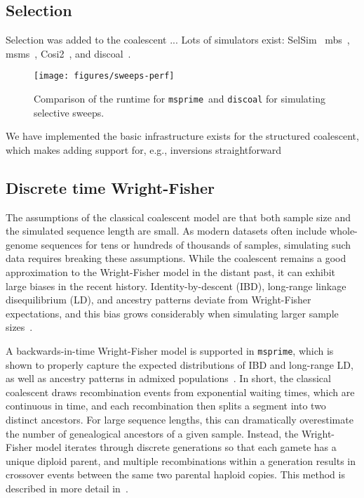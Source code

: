 \documentclass{article}
\newcommand{\msprime}[0]{\texttt{msprime}}
\begin{document}
\subsection*{Selection}
Selection was added to the coalescent ... Lots of simulators exist:
SelSim~\citep{spencer2004selsim}
mbs~\citep{teshima2009mbs},
msms~\citep{ewing2010msms},
Cosi2~\citep{shlyakhter2014cosi2},
and discoal~\citep{kern2016discoal}.

\begin{figure}
\texttt{[image: figures/sweeps-perf]}
\caption{\label{fig-selection-perf}Comparison of the runtime for
\msprime\ and \texttt{discoal} for simulating selective sweeps.
}
\end{figure}

We have implemented the basic infrastructure exists for the structured
coalescent, which makes adding support for, e.g.,
inversions straightforward~\citep{peischl2013sequential}

\subsection*{Discrete time Wright-Fisher}

The assumptions of the classical coalescent model are that both sample size and
the simulated sequence length are small. As modern datasets often include
whole-genome sequences for tens or hundreds of thousands of samples, simulating
such data requires breaking these assumptions. While the coalescent remains a
good approximation to the Wright-Fisher model in the distant past, it can
exhibit large biases in the recent history. Identity-by-descent (IBD),
long-range linkage disequilibrium (LD), and ancestry patterns deviate from
Wright-Fisher expectations, and this bias grows considerably when simulating
larger sample
sizes~\citep{wakeley2012gene,bhaskar2014distortion,nelson2020accounting}.

A backwards-in-time Wright-Fisher model is supported in \msprime, which is
shown to properly capture the expected distributions of IBD and long-range LD,
as well as ancestry patterns in admixed
populations~\citep{nelson2020accounting}. In short, the classical coalescent
draws recombination events from exponential waiting times, which are continuous
in time, and each recombination then splits a segment into two distinct
ancestors. For large sequence lengths, this can dramatically overestimate the
number of genealogical ancestors of a given sample. Instead, the Wright-Fisher
model iterates through discrete generations so that each gamete has a unique
diploid parent, and multiple recombinations within a generation results in
crossover events between the same two parental haploid copies.  This method is
described in more detail in~\cite{nelson2020accounting}.
\end{document}
